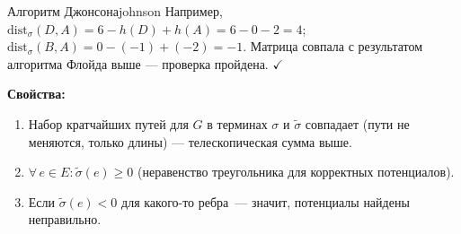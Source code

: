 \begin{algo}{Алгоритм Джонсона}{johnson}
Например, $\mathrm{dist}_\sigma(D, A) = 6 - h(D) + h(A) = 6 - 0 - 2 = 4$;
$\mathrm{dist}_\sigma(B, A) = 0 - (-1) + (-2) = -1$. Матрица совпала с
результатом алгоритма Флойда выше --- проверка пройдена. $\checkmark$

\textbf{Свойства:}
\begin{enumerate}
  \item Набор кратчайших путей для $G$ в терминах $\sigma$ и $\tilde{\sigma}$ совпадает (пути не меняются, только длины) --- телескопическая сумма выше.
  \item $\forall\, e \in E\colon \tilde{\sigma}(e) \geq 0$ (неравенство треугольника для корректных потенциалов).
  \item Если $\tilde{\sigma}(e) < 0$ для какого-то ребра~--- значит, потенциалы найдены неправильно.
\end{enumerate}

\end{algo}

